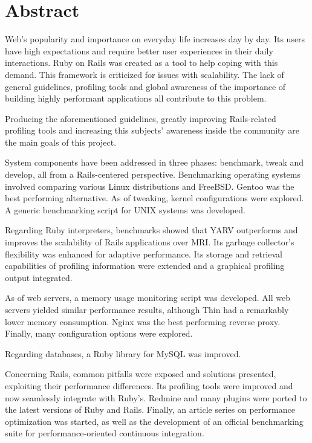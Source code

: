 
\chapter*{Abstract}
Web's popularity and importance on everyday life increases day by day. Its users have high expectations and require better user experiences in their daily interactions. Ruby on Rails was created as a tool to help coping with this demand. This framework is criticized for issues with scalability. The lack of general guidelines, profiling tools and global awareness of the importance of building highly performant applications all contribute to this problem.

Producing the aforementioned guidelines, greatly improving Rails-related profiling tools and increasing this subjects' awareness inside the community are the main goals of this project.

System components have been addressed in three phases: benchmark, tweak and develop, all from a Rails-centered perspective. Benchmarking operating systems involved comparing various Linux distributions and FreeBSD. Gentoo was the best performing alternative. As of tweaking, kernel configurations were explored. A generic benchmarking script for UNIX systems was developed.

Regarding Ruby interpreters, benchmarks showed that YARV outperforms and improves the scalability of Rails applications over MRI. Its garbage collector's flexibility was enhanced for adaptive performance. Its storage and retrieval capabilities of profiling information were extended and a graphical profiling output integrated. 

As of web servers, a memory usage monitoring script was developed. All web servers yielded similar performance results, although Thin had a remarkably lower memory consumption. Nginx was the best performing reverse proxy. Finally, many configuration options were explored. 

Regarding databases, a Ruby library for MySQL was improved.

Concerning Rails, common pitfalls were exposed and solutions presented, exploiting their performance differences. Its profiling tools were improved and now seamlessly integrate with Ruby's. Redmine and many plugins were ported to the latest versions of Ruby and Rails. Finally, an article series on performance optimization was started, as well as the development of an official benchmarking suite for performance-oriented continuous integration.


